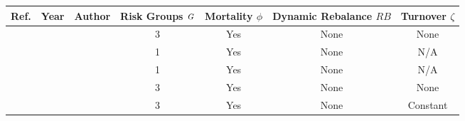 \begin{tabular}{cllcccc}
	\toprule
	         Ref.           & Year                        & Author                        & Risk Groups ${\mbox{\footnotesize{\textit{G}}}}$ & Mortality $\phi$ & Dynamic Rebalance $RB$ & Turnover $\zeta$ \\
	\midrule
	  \cite{Hallett2008}    & \citeyear{Hallett2008}      & \citeauthor{Hallett2008}      &        3         &       Yes        &          None          &       None       \\
	\cite{Barnighausen2012} & \citeyear{Barnighausen2012} & \citeauthor{Barnighausen2012} &        1         &       Yes        &          None          &       N/A        \\
	   \cite{Estill2012}    & \citeyear{Estill2012}       & \citeauthor{Estill2012}       &        1         &       Yes        &          None          &       N/A        \\
	   \cite{Cremin2013}    & \citeyear{Cremin2013}       & \citeauthor{Cremin2013}       &        3         &       Yes        &          None          &       None       \\
	   \cite{Eaton2014}     & \citeyear{Eaton2014}        & \citeauthor{Eaton2014}        &        3         &       Yes        &          None          &     Constant     \\
	\bottomrule
\end{tabular}